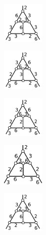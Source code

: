 \documentclass[suppldata, dvipdfmx]{interact}
\theoremstyle{plain}%
\theoremstyle{definition}
\theoremstyle{remark}
\theoremstyle{problemstyle}
\begin{document}
\begin{figure}[h!tbp]
\begin{minipage}[t]{0.75\textwidth}
\begin{minipage}[t]{0.15\textwidth}
   \includegraphics[width=0.8in, keepaspectratio]{./img/HexahedraWithSphericalFaces/cube/cube_d.png}
   \subcaption{}
   \label{fig:}
  \end{minipage}
 \hspace*{\fill}
  \begin{minipage}[t]{0.15\textwidth}
   \centering
   \includegraphics[width=0.8in, keepaspectratio]{./img/HexahedraWithSphericalFaces/cube/cube_e.png}
   \subcaption{}
   \label{fig:}
  \end{minipage}
 \hspace*{\fill}
\begin{minipage}[t]{0.15\textwidth}
   \centering
   \includegraphics[width=0.8in,
 keepaspectratio]{./img/HexahedraWithSphericalFaces/cube/cube_f.png}
   \subcaption{}
   \label{fig:}
  \end{minipage}
 \hspace*{\fill}
  \begin{minipage}[t]{0.15\textwidth}
   \centering
   \includegraphics[width=0.8in,
   keepaspectratio]{./img/HexahedraWithSphericalFaces/cube/cube_g.png}
   \subcaption{}
   \label{fig:}
  \end{minipage}
  \hspace*{\fill}
  \begin{minipage}[t]{0.15\textwidth}
   \centering
   \includegraphics[width=0.8in, keepaspectratio]{./img/HexahedraWithSphericalFaces/cube/cube_h.png}

\end{minipage}
\end{minipage}
\end{figure}
\end{document}
